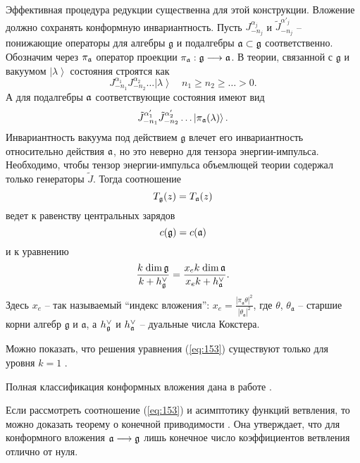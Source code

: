 Эффективная процедура редукции существенна для этой конструкции. Вложение должно сохранять конформную инвариантность. Пусть $J^{\alpha_j}_{-n_j}$ и $\tilde{J}^{\alpha'_j}_{-n_j}$ -- понижающие операторы для алгебры $\mathfrak{g}$ и подалгебры $\mathfrak{a}\subset\mathfrak{g}$ соответственно. Обозначим через $\pi_{\mathfrak{a}}$ оператор проекции $\pi_{\mathfrak{a}}:\mathfrak{g}\longrightarrow \mathfrak{a}$. В теории, связанной с $\mathfrak{g}$ и вакуумом $\left|\lambda\right>$ состояния строятся как
\begin{equation*}
  \label{eq:151}
  J^{\alpha_1}_{-n_1}J^{\alpha_2}_{-n_2}\dots\left|\lambda\right>\quad n_1\geq n_2\geq \dots>0.
\end{equation*}
А для подалгебры $\mathfrak{a}$ соответствующие состояния имеют вид
\begin{equation*}
  \label{eq:152}
  \tilde{J}^{\alpha'_1}_{-n_1}\tilde{J}^{\alpha'_2}_{-n_2}\dots\left|\pi_{\mathfrak{a}}(\lambda)\right>.
\end{equation*}
Инвариантность вакуума под действием $\mathfrak{g}$ влечет его инвариантность относительно действия $\mathfrak{a}$, но это неверно для тензора энергии-импульса. Необходимо, чтобы тензор энергии-импульса объемлющей теории содержал только генераторы $\tilde{J}$. Тогда соотношение
\begin{equation}
  \label{eq:127}
  T_{\mathfrak{g}}(z)=T_{\mathfrak{a}}(z)
\end{equation}
ведет к равенству центральных зарядов
\begin{equation*}
  \label{eq:33}
  c(\mathfrak{g})=c(\mathfrak{a})
\end{equation*}
и к уравнению
\begin{equation}
  \label{eq:153}
  \frac{k\;\mathrm{dim}\,\mathfrak{g}}{k+h^{\vee}_{\mathfrak{g}}}=\frac{x_e k\; \mathrm{dim}\,\mathfrak{a}}{x_ek+h^{\vee}_{\mathfrak{a}}}.
\end{equation}
Здесь $x_e$ -- так называемый ``индекс вложения'':
$x_e=\frac{\left|\pi_{\mathfrak{a}} \theta\right|^2}{\left|\theta_{\mathfrak{a}}\right|^2}$, где $\theta$, $\theta_{\mathfrak{a}}$ -- старшие корни алгебр
$\mathfrak{g}$ и $\mathfrak{a}$, а  $h^{\vee}_{\mathfrak{g}}$ и $h^{\vee}_{\mathfrak{a}}$ -- дуальные числа Кокстера.

Можно показать, что решения уравнения (\ref{eq:153}) существуют только для уровня $k=1$ \cite{difrancesco1997cft}.

Полная классификация конформных вложения дана в работе \cite{schellekens1986conformal}.

Если рассмотреть соотношение (\ref{eq:153}) и асимптотику функций ветвления, то можно доказать теорему о конечной приводимости \cite{kac1988modular}. Она утверждает, что для конформного вложения  $\mathfrak{a}\longrightarrow\mathfrak{g}$ лишь конечное число коэффициентов ветвления отлично от нуля.

